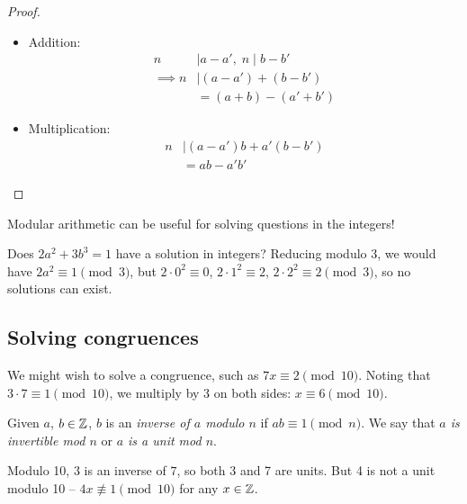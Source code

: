 \documentclass{../../template/note}
\begin{document}
    \begin{proof}
        \begin{itemize}
            \item Addition:
            \begin{align*}
                n &\mid a - a',\; n \mid b - b' \\
                \implies n &\mid (a - a') + (b - b') \\
                &= (a + b) - (a' + b')
            \end{align*}
            \item Multiplication:
            \begin{align*}
                n &\mid (a - a')b + a'(b - b') \\
                &= ab - a'b'
            \end{align*}            
        \end{itemize}        
    \end{proof}
    
    Modular arithmetic can be useful for solving questions in the integers!

    \begin{example}
        Does \(2a^2 + 3b^3 = 1\) have a solution in integers? Reducing modulo 3, we would have \(2a^2 \equiv 1 \pmod 3\), but \(2 \cdot 0^2 \equiv 0\), \(2 \cdot 1^2 \equiv 2\), \(2 \cdot 2^2 \equiv 2 \pmod 3\), so no solutions can exist.
    \end{example}
    

    \subsection{Solving congruences}

    We might wish to solve a congruence, such as \(7x \equiv 2 \pmod {10}\). Noting that \(3 \cdot 7 \equiv 1 \pmod {10}\), we multiply by 3 on both sides: \(x \equiv 6 \pmod {10}\).

    \begin{definition}
        Given \(a\), \(b \in \mathbb Z\), \(b\) is an \emph{inverse of \(a\) modulo \(n\)} if \(ab \equiv 1 \pmod n\). We say that \emph{\(a\) is invertible mod \(n\)} or \emph{\(a\) is a unit mod \(n\)}.
    \end{definition}
    
    \begin{example}
        Modulo 10, \(3\) is an inverse of \(7\), so both 3 and 7 are units. But 4 is not a unit modulo 10 -- \(4x \not\equiv 1 \pmod {10}\) for any \(x \in \mathbb Z\).
    \end{example}
\end{document}
